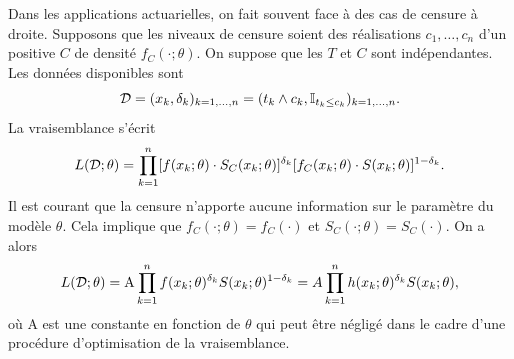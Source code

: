 \noindent Dans les applications actuarielles, on fait souvent face à des cas de censure à droite. Supposons que les niveaux de censure soient des réalisations \iid $c_1,\ldots, c_n$ d'un \va positive $C$ de densité $f_C(\cdot;\theta)$. On suppose que les \va $T$ et $C$ sont indépendantes. Les données disponibles sont
$$ 
\mathcal{D} = (x_k,\delta_k)_{k=1,\ldots, n} = (t_k\land c_k,\mathbb{I}_{t_k\leq c_k})_{k=1,\ldots, n}.
$$
La vraisemblance s'écrit
$$
L(\mathcal{D};\theta) = \prod_{k=1}^n[f(x_k;\theta)\cdot S_C(x_k;\theta)]^{\delta_k}[f_C(x_k;\theta)\cdot S(x_k;\theta)]^{1-\delta_k}.
$$
Il est courant que la censure n'apporte aucune information sur le paramètre du modèle $\theta$. Cela implique que $f_C(\cdot;\theta) = f_C(\cdot)$ et $S_C(\cdot;\theta) = S_C(\cdot)$. On a alors
$$
L(\mathcal{D};\theta) = \text{A}\prod_{k=1}^nf(x_k;\theta)^{\delta_k}S(x_k;\theta)^{1-\delta_k} =  A\prod_{k=1}^nh(x_k;\theta)^{\delta_k}S(x_k;\theta),
$$
où $\text{A}$ est une constante en fonction de $\theta$ qui peut être négligé dans le cadre d'une procédure d'optimisation de la vraisemblance. 
